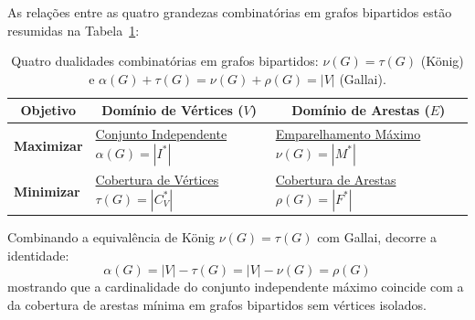 As relações entre as quatro grandezas combinatórias em grafos bipartidos estão resumidas na Tabela~\ref{tab:dualidades}:

\begin{table}[!ht]
\centering
\small
\setlength{\tabcolsep}{12pt}
\begin{tabular}{l l l}
\toprule
\multicolumn{1}{c}{\textbf{Objetivo}} & \multicolumn{1}{c}{\textbf{Domínio de Vértices ($V$)}} & \multicolumn{1}{c}{\textbf{Domínio de Arestas ($E$)}} \\
\midrule
\textbf{Maximizar} & \hyperref[sec:conjunto_independente]{Conjunto Independente} $\alpha(G) = |I^*|$ & \hyperref[sec:emparelhamento]{Emparelhamento Máximo} $\nu(G) = |M^*|$ \\
\addlinespace[0.4em]
\textbf{Minimizar} & \hyperref[sec:cobertura]{Cobertura de Vértices} $\tau(G) = |C_V^*|$ & \hyperref[sec:cobertura_arcos]{Cobertura de Arestas} $\rho(G) = |F^*|$ \\
\bottomrule
\end{tabular}
\caption{Quatro dualidades combinatórias em grafos bipartidos: $\nu(G) = \tau(G)$ (König) e $\alpha(G) + \tau(G) = \nu(G) + \rho(G) = |V|$ (Gallai).}
\label{tab:dualidades}
\end{table}

Combinando a equivalência de König $\nu(G) = \tau(G)$ com Gallai, decorre a identidade:
\begin{equation}
    \alpha(G) = |V| - \tau(G) = |V| - \nu(G) = \rho(G)
\end{equation}
mostrando que a cardinalidade do conjunto independente máximo coincide com a da cobertura de arestas mínima em grafos bipartidos sem vértices isolados.

